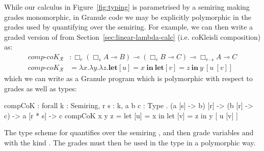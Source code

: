\begin{example}
\label{example:graded-granule}
While our calculus in Figure~\ref{fig:typing} is parametrised by a semiring
making grades monomorphic, in Granule code we may be explicitly polymorphic in
the grades used by quantifying over the semiring. For example, we can then write
a graded version of  from Section~\ref{sec:linear-lambda-calc}
(i.e. coKleisli composition) as: 
\begin{align*}
\textit{comp-}\textit{coK}_{\mathcal{R}} & : \Box_r (\Box_s A \multimap B) \multimap (\Box_r B \multimap C) \multimap \Box_{r \cdot s} A \multimap C \\
\textit{comp-}\textit{coK}_{\mathcal{R}} & = \lambda x . \lambda y . \lambda z . \textbf{let}[u] = x\ \textbf{in}\ \textbf{let}[v] = z\ \textbf{in}\ y\ [u\ [ v ] ]
\end{align*}
which we can write as a Granule program which is polymorphic with respect to
grades as well as types:
\begin{granule}
compCoK : forall {k : Semiring, r s : k, a b c : Type} 
     . (a [s] -> b) [r] 
     -> (b [r] -> c) 
     -> a [r * s] 
     -> c
compCoK x y z = let [u] = x in let [v] = z in y  [ u [v] ]
\end{granule}
The type scheme for  quantifies over the semiring ,
and then grade variables  and  with the kind . The
grades must then be used in the type in a polymorphic way.
\end{example}

